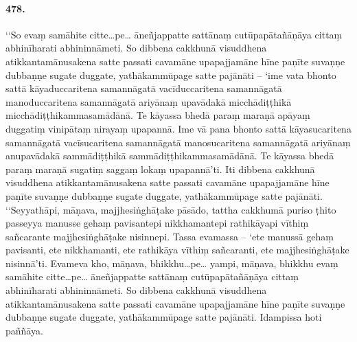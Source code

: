 \paragraph{478.} ‘‘So evaṃ samāhite citte…pe… āneñjappatte sattānaṃ cutūpapātañāṇāya cittaṃ abhinīharati abhininnāmeti. So dibbena cakkhunā visuddhena atikkantamānusakena satte passati cavamāne upapajjamāne hīne paṇīte suvaṇṇe dubbaṇṇe sugate duggate, yathākammūpage satte pajānāti – ‘ime vata bhonto sattā kāyaduccaritena samannāgatā vacīduccaritena samannāgatā manoduccaritena samannāgatā ariyānaṃ upavādakā micchādiṭṭhikā micchādiṭṭhikammasamādānā. Te kāyassa bhedā paraṃ maraṇā apāyaṃ duggatiṃ vinipātaṃ nirayaṃ upapannā. Ime vā pana bhonto sattā kāyasucaritena samannāgatā vacīsucaritena samannāgatā manosucaritena samannāgatā ariyānaṃ anupavādakā sammādiṭṭhikā sammādiṭṭhikammasamādānā. Te kāyassa bhedā paraṃ maraṇā sugatiṃ saggaṃ lokaṃ upapannā’ti. Iti dibbena cakkhunā visuddhena atikkantamānusakena satte passati cavamāne upapajjamāne hīne paṇīte suvaṇṇe dubbaṇṇe sugate duggate, yathākammūpage satte pajānāti. ‘‘Seyyathāpi, māṇava, majjhesiṅghāṭake pāsādo, tattha cakkhumā puriso ṭhito passeyya manusse gehaṃ pavisantepi nikkhamantepi rathikāyapi vīthiṃ sañcarante majjhesiṅghāṭake nisinnepi. Tassa evamassa – ‘ete manussā gehaṃ pavisanti, ete nikkhamanti, ete rathikāya vīthiṃ sañcaranti, ete majjhesiṅghāṭake nisinnā’ti. Evameva kho, māṇava, bhikkhu…pe… yampi, māṇava, bhikkhu evaṃ samāhite citte…pe… āneñjappatte sattānaṃ cutūpapātañāṇāya cittaṃ abhinīharati abhininnāmeti. So dibbena cakkhunā visuddhena atikkantamānusakena satte passati cavamāne upapajjamāne hīne paṇīte suvaṇṇe dubbaṇṇe sugate duggate, yathākammūpage satte pajānāti. Idampissa hoti paññāya.

